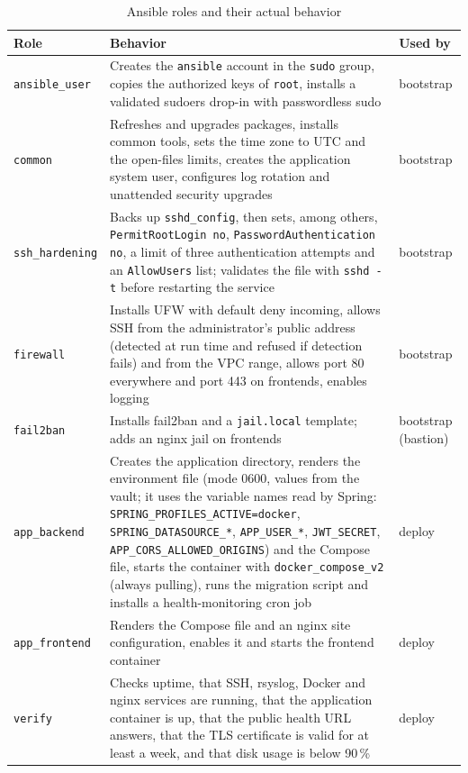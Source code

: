 \begin{table}[tb]
\centering
\caption{Ansible roles and their actual behavior}
\label{tab:roles-impl}
\small
\begin{tabularx}{\linewidth}{@{}l X l@{}}
\toprule
\textbf{Role} & \textbf{Behavior} & \textbf{Used by} \\
\midrule
\texttt{ansible\_user} & Creates the \texttt{ansible} account in the \texttt{sudo} group, copies the authorized keys of \texttt{root}, installs a validated sudoers drop-in with passwordless sudo & bootstrap \\
\texttt{common} & Refreshes and upgrades packages, installs common tools, sets the time zone to UTC and the open-files limits, creates the application system user, configures log rotation and unattended security upgrades & bootstrap \\
\texttt{ssh\_hardening} & Backs up \texttt{sshd\_config}, then sets, among others, \texttt{PermitRootLogin no}, \texttt{PasswordAuthentication no}, a limit of three authentication attempts and an \texttt{AllowUsers} list; validates the file with \texttt{sshd -t} before restarting the service & bootstrap \\
\texttt{firewall} & Installs UFW with default deny incoming, allows SSH from the administrator's public address (detected at run time and refused if detection fails) and from the VPC range, allows port 80 everywhere and port 443 on frontends, enables logging & bootstrap \\
\texttt{fail2ban} & Installs fail2ban and a \texttt{jail.local} template; adds an nginx jail on frontends & bootstrap (bastion) \\
\texttt{app\_backend} & Creates the application directory, renders the environment file (mode 0600, values from the vault; it uses the variable names read by Spring: \texttt{SPRING\_PROFILES\_ACTIVE=docker}, \texttt{SPRING\_DATASOURCE\_*}, \texttt{APP\_USER\_*}, \texttt{JWT\_SECRET}, \texttt{APP\_CORS\_ALLOWED\_ORIGINS}) and the Compose file, starts the container with \texttt{docker\_compose\_v2} (always pulling), runs the migration script and installs a health-monitoring cron job & deploy \\
\texttt{app\_frontend} & Renders the Compose file and an nginx site configuration, enables it and starts the frontend container & deploy \\
\texttt{verify} & Checks uptime, that SSH, rsyslog, Docker and nginx services are running, that the application container is up, that the public health URL answers, that the TLS certificate is valid for at least a week, and that disk usage is below 90\,\% & deploy \\

\end{tabularx}
\end{table}
